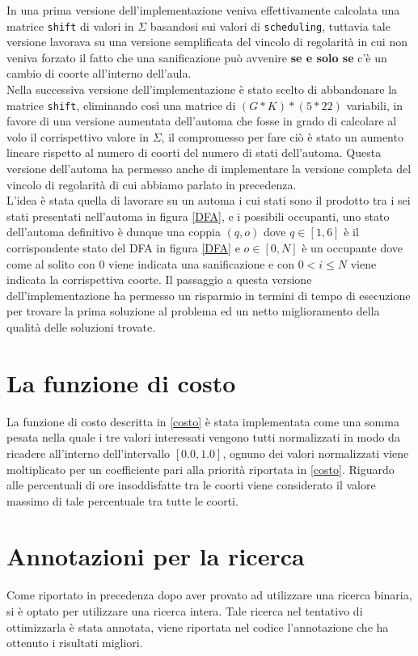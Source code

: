 \documentclass[12pt, italian, openany]{book}
\begin{document}
In una prima versione dell'implementazione veniva effettivamente calcolata una matrice \texttt{shift} di valori in $\Sigma$ basandosi sui valori di \texttt{scheduling}, tuttavia tale versione lavorava su una versione semplificata del vincolo di regolarità in cui non veniva forzato il fatto che una sanificazione può avvenire \textbf{se e solo se} c'è un cambio di coorte all'interno dell'aula.\\
Nella successiva versione dell'implementazione è stato scelto di abbandonare la matrice \texttt{shift}, eliminando così una matrice di $(G*K)*(5*22)$ variabili, in favore di una versione aumentata dell'automa che fosse in grado di calcolare al volo il corrispettivo valore in $\Sigma$, il compromesso per fare ciò è stato un aumento lineare rispetto al numero di coorti del numero di stati dell'automa. Questa versione dell'automa ha permesso anche di implementare la versione completa del vincolo di regolarità di cui abbiamo parlato in precedenza.\\
L'idea è stata quella di lavorare su un automa i cui stati sono il prodotto tra i sei stati presentati nell'automa in figura \ref{DFA}, e i possibili occupanti, uno stato dell'automa definitivo è dunque una coppia $(q, o)$ dove $q \in \left[1, 6\right]$ è il corrispondente stato del DFA in figura \ref{DFA} e $o \in \left[0, N\right]$ è un occupante dove come al solito con $0$ viene indicata una sanificazione e con $0 < i \leq N$ viene indicata la corrispettiva coorte.
Il passaggio a questa versione dell'implementazione ha permesso un risparmio in termini di tempo di esecuzione per trovare la prima soluzione al problema ed un netto miglioramento della qualità delle soluzioni trovate.

\section{La funzione di costo}
La funzione di costo descritta in \ref{costo} è stata implementata come una somma pesata nella quale i tre valori interessati vengono tutti normalizzati in modo da ricadere all'interno dell'intervallo $\left[0.0, 1.0\right]$, ognuno dei valori normalizzati viene moltiplicato per un coefficiente pari alla priorità riportata in \ref{costo}. Riguardo alle percentuali di ore insoddisfatte tra le coorti viene considerato il valore massimo di tale percentuale tra tutte le coorti.

\section{Annotazioni per la ricerca}
Come riportato in precedenza dopo aver provato ad utilizzare una ricerca binaria, si è optato per utilizzare una ricerca intera. Tale ricerca nel tentativo di ottimizzarla è stata annotata, viene riportata nel codice l'annotazione che ha ottenuto i risultati migliori. 
\end{document}
